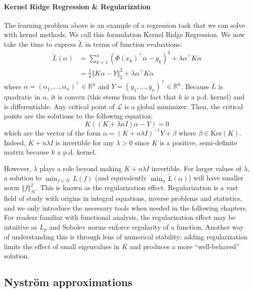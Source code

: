 \paragraph{Kernel Ridge Regression \& Regularization} The learning problem above is an example of a regression task that we can solve with kernel methods. We call this formulation Kernel Ridge Regression. We now take the time to express $\tilde L$ in terms of function evaluations:
\begin{align}
\tilde L(\alpha) &= \sum_{k=1}^n (\Phi(x_k)^\top \alpha - y_k)^2 + \lambda \alpha^\top K\alpha\\
               & = \frac{1}{n}\Vert K\alpha - Y \Vert_2^2 + \lambda \alpha^\top K\alpha
\end{align}
where $\alpha = (\alpha_1, \ldots, \alpha_n)^\top \in\mathbb R^n$ and $Y = (y_1, \ldots, y_n)^\top\in\mathbb R^n$. Because $\tilde L$ is quadratic in $\alpha$, it is convex (this stems from the fact that $k$ is a p.d. kernel) and is differentiable. Any critical point of $\mathcal L$ is a global minimizer. Then, the critical points are the solutions to the following equation:
\begin{equation}
K\left((K + \lambda n I)\alpha - Y\right) = 0
\end{equation}
which are the vector of the form $\alpha = (K + n\lambda I)^{-1}Y + \beta$ where $\beta \in \mathrm{Ker}(K)$. Indeed, $K + n\lambda I$ is invertible for any $\lambda > 0$ since $K$ is a positive, semi-definite matrix because $k$ a p.d. kernel.

However, $\lambda$ plays a role beyond making $K+n\lambda I$ invertible. For larger values of $\lambda$, a solution to $\min_{f\in\mathcal H}L(f)$ (and equivalently $\min_\alpha \tilde L(\alpha)$) will have smaller norm $\Vert f \Vert_\mathcal H^2$. This is known as the regularization effect. Regularization is a vast field of study with origins in integral equations, inverse problems and statistics, and we only introduce the necessary tools when needed in the following chapters. For readers familiar with functional analysis, the regularization effect may be intuitive as $L_p$ and Sobolev norms enforce regularity of a function. Another way of understanding this is through lens of numerical stability: adding regularization limits the effect of small eigenvalues in $K$ and produces a more ``well-behaved'' solution.


\subsection{Nyström approximations}

